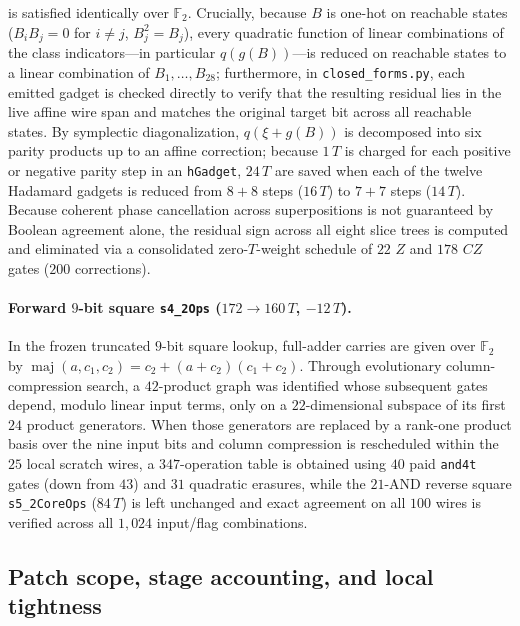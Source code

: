 \documentclass[11pt,a4paper]{article}
\theoremstyle{definition}
\theoremstyle{remark}
\begin{document}
is satisfied identically over \(\mathbb{F}_2\). Crucially, because \(B\) is one-hot on reachable states (\(B_i B_j = 0\) for \(i \ne j\), \(B_j^2 = B_j\)), every quadratic function of linear combinations of the class indicators---in particular \(q(g(B))\)---is reduced on reachable states to a linear combination of \(B_1, \dots, B_{28}\); furthermore, in \texttt{closed\_forms.py}, each emitted gadget is checked directly to verify that the resulting residual lies in the live affine wire span and matches the original target bit across all reachable states. By symplectic diagonalization, \(q(\xi + g(B))\) is decomposed into six parity products up to an affine correction; because \(1\,T\) is charged for each positive or negative parity step in an \texttt{hGadget}, \(24\,T\) are saved when each of the twelve Hadamard gadgets is reduced from \(8+8\) steps (\(16\,T\)) to \(7+7\) steps (\(14\,T\)). Because coherent phase cancellation across superpositions is not guaranteed by Boolean agreement alone, the residual sign across all eight slice trees is computed and eliminated via a consolidated zero-\(T\)-weight schedule of \(22\) \(Z\) and \(178\) \(CZ\) gates (\(200\) corrections).

\paragraph{Forward \(9\)-bit square \texttt{s4\_2Ops} (\(172 \to 160\,T\), \(-12\,T\)).}
In the frozen truncated \(9\)-bit square lookup, full-adder carries are given over \(\mathbb{F}_2\) by \(\operatorname{maj}(a,c_1,c_2) = c_2 + (a+c_2)(c_1+c_2)\). Through evolutionary column-compression search, a \(42\)-product graph was identified whose subsequent gates depend, modulo linear input terms, only on a \(22\)-dimensional subspace of its first \(24\) product generators. When those generators are replaced by a rank-one product basis over the nine input bits and column compression is rescheduled within the \(25\) local scratch wires, a \(347\)-operation table is obtained using \(40\) paid \texttt{and4t} gates (down from \(43\)) and \(31\) quadratic erasures, while the \(21\)-AND reverse square \texttt{s5\_2CoreOps} (\(84\,T\)) is left unchanged and exact agreement on all \(100\) wires is verified across all \(1{,}024\) input/flag combinations.

\subsection{Patch scope, stage accounting, and local tightness}
\end{document}
